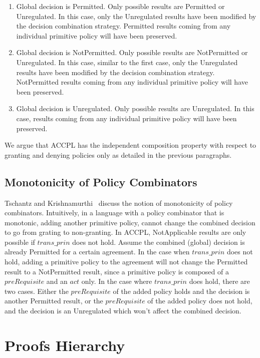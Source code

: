 \begin{enumerate}
  \item Global decision is Permitted. Only possible results are Permitted or Unregulated. In this case, only the Unregulated results have been modified by the decision combination strategy. Permitted results coming from any individual primitive policy will have been preserved.
  \item Global decision is NotPermitted. Only possible results are NotPermitted or Unregulated. In this case, similar to the first case, only the Unregulated results have been modified by the decision combination strategy. NotPermitted results coming from any individual primitive policy will have been preserved.
   \item Global decision is Unregulated. Only possible results are Unregulated.  In this case, results coming from any individual primitive policy will have been preserved.
\end{enumerate}

We argue that \ac{ACCPL} has the independent composition property with respect to granting and denying policies only as detailed in the previous paragraphs. 

\subsection{Monotonicity of Policy Combinators}

Tschantz and Krishnamurthi~\cite{Tschantz} discuss the notion of monotonicity of policy combinators. Intuitively, in a language with a policy combinator that is monotonic, adding another primitive policy, cannot change the combined decision to go from grating to non-granting. In \ac{ACCPL}, NotApplicable results are only possible if $trans\_prin$ does not hold. Assume the combined (global) decision is already Permitted for a certain agreement. In the case when $trans\_prin$ does not hold, adding a primitive policy to the agreement will not change the Permitted result to a NotPermitted result, since a primitive policy is composed of a $preRequisite$ and an $act$ only. In the case where $trans\_prin$ does hold, there are two cases. Either the $preRequisite$ of the added policy holds and the decision is another Permitted result, or the $preRequisite$ of the added policy does not hold, and the decision is an Unregulated which won't affect the combined decision.





\section{Proofs Hierarchy}\label{sec:intermediatetheorems}


